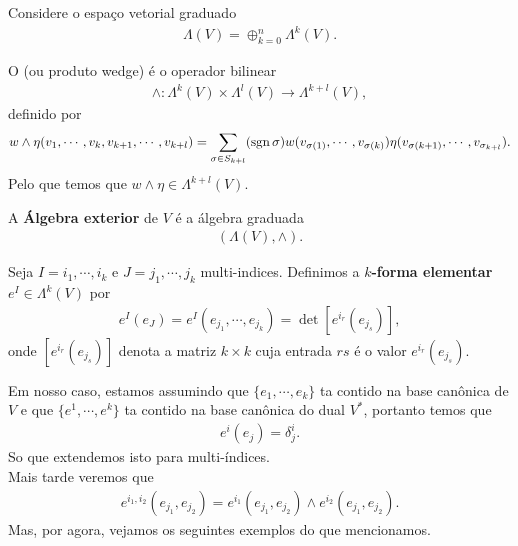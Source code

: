 Considere o espaço vetorial graduado
\begin{align*}
  \Lambda(V)=\oplus_{k=0}^{n}\Lambda^{k}(V).
\end{align*}
\begin{definition}
  O  (ou produto wedge) é o operador bilinear
  \begin{align*}
    \wedge:\Lambda^{k}(V)\times\Lambda^{l}(V)\to\Lambda^{k+l}(V),
  \end{align*}
  definido por
  \begin{align*}
    w\wedge\eta (v_1,\cdots,v_k,v_{k+1},\cdots,v_{k+l})=\sum_{\sigma\in S_{k+l}}(\operatorname{sgn}\sigma)w(v_{\sigma(1)},\cdots,v_{\sigma(k)})\eta(v_{\sigma(k+1)},\cdots,v_{\sigma_{k+l}}).
  \end{align*}
  Pelo que temos que $w\wedge\eta\in\Lambda^{k+l}(V)$.
\end{definition}
\begin{definition}
  A \textbf{Álgebra exterior} de $V$ é a álgebra graduada
  \begin{align*}
    \left( \Lambda(V),\wedge \right).
  \end{align*}
\end{definition}
\begin{definition}
  Seja $I=i_1,\cdots,i_k$ e $J=j_1,\cdots,j_k$ multi-indices. Definimos a \textbf{$k$-forma elementar} $e^{I}\in\Lambda^{k}(V)$ por
  \begin{align*}
    e^{I}(e_J)=e^{I}(e_{j_1},\cdots,e_{j_k})=\det\left[ e^{i_r}(e_{j_s}) \right],
  \end{align*}
  onde $\left[ e^{i_r}(e_{j_s}) \right]$ denota a matriz $k\times k$ cuja entrada $rs$ é o valor $e^{i_r}(e_{j_s})$. 
\end{definition}
\begin{note}
  Em nosso caso, estamos assumindo que $\{e_1,\cdots,e_k\}$ ta contido na base canônica de $V$ e que $\{e^{1},\cdots,e^{k}\}$ ta contido na base canônica do dual $V^{\ast}$, portanto temos que
  \begin{align*}
    e^{i}(e_j)=\delta^{i}_j.
  \end{align*}
  So que extendemos isto para multi-índices.\\
  Mais tarde veremos que
  \begin{align*}
    e^{i_1,i_2}(e_{j_1},e_{j_2})=e^{i_1}(e_{j_1},e_{j_2})\wedge e^{i_2}(e_{j_1},e_{j_2}).
  \end{align*}
  Mas, por agora, vejamos os seguintes exemplos do que mencionamos.
\end{note}
